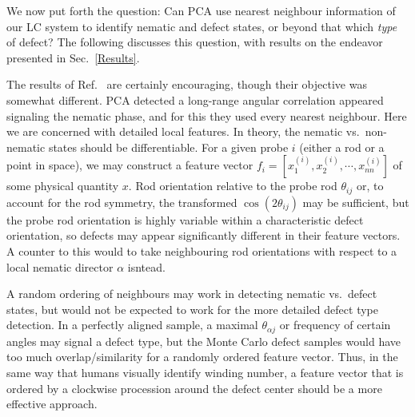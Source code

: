 We now put forth the question: Can PCA use nearest neighbour information of our LC system to identify nematic and defect states, or beyond that which \textit{type} of defect?
The following discusses this question, with results on the endeavor presented in Sec.\ \ref{Results}.

The results of Ref.\ \cite{jadrich2018offlattice} are certainly encouraging, though their objective was somewhat different. PCA detected a long-range angular correlation appeared signaling the nematic phase, and for this they used every  nearest neighbour. Here we are concerned with detailed local features. In theory, the nematic vs.\ non-nematic states should be differentiable. For a given probe $i$ (either a rod or a point in space), we may construct a feature vector $f_i = [x_1^{(i)},x_2^{(i)},\cdots,x_{nn}^{(i)}]$ of some physical quantity $x$. Rod orientation relative to the probe rod $\theta_{ij}$ or, to account for the rod symmetry, the transformed $\cos(2\theta_{ij})$ may be sufficient, but the probe rod orientation is highly variable within a characteristic defect orientation, so defects may appear significantly different in their feature vectors. A counter to this would to take neighbouring rod orientations with respect to a local nematic director $\alpha$ isntead. 

A random ordering of neighbours may work in detecting nematic vs.\ defect states, but would not be expected to work for the more detailed defect type detection. In a perfectly aligned sample, a maximal $\theta_{\alpha j}$ or frequency of certain angles may signal a defect type, but the Monte Carlo defect samples would have too much overlap/similarity for a randomly ordered feature vector. Thus, in the same way that humans visually identify winding number, a feature vector that is ordered by a clockwise procession around the defect center should be a more effective approach.






